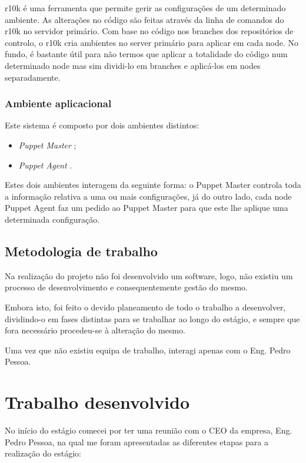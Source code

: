 \documentclass{article}
\begin{document}
r10k \cite{r10k} é uma ferramenta que permite gerir as configurações de um determinado ambiente. As alterações no código são feitas através da linha de comandos do r10k no servidor primário. Com base no código nos branches dos repositórios de controlo, o r10k cria ambientes no server primário para aplicar em cada node. No fundo, é bastante útil para não termos que aplicar a totalidade do código num determinado node mas sim dividi-lo em branches e aplicá-los em nodes separadamente.

\subsubsection{Ambiente aplicacional}
Este sistema é composto por dois ambientes distintos:

\begin{itemize}
    \item \textit{Puppet Master} \cite{puppet-master};
    \item \textit{Puppet Agent} \cite{puppet-agent}.
\end{itemize}

Estes dois ambientes interagem da seguinte forma: o Puppet Master \cite{puppet-master} controla toda a informação relativa a uma ou mais configurações, já do outro lado, cada node Puppet Agent \cite{puppet-agent} faz um pedido ao Puppet Master \cite{puppet-master} para que este lhe aplique uma determinada configuração.

\subsection{Metodologia de trabalho}
Na realização do projeto não foi desenvolvido um software, logo, não existiu um processo de desenvolvimento e consequentemente gestão do mesmo.

Embora isto, foi feito o devido planeamento de todo o trabalho a desenvolver, dividindo-o em fases distintas para se trabalhar ao longo do estágio, e sempre que fora necessário procedeu-se à alteração do mesmo.

Uma vez que não existiu equipa de trabalho, interagi apenas com o Eng. Pedro Pessoa. 

\cleardoublepage
\section{Trabalho desenvolvido}
No início do estágio comecei por ter uma reunião com o CEO da empresa, Eng. Pedro Pessoa, na qual me foram apresentadas as diferentes etapas para a realização do estágio:
\end{document}
